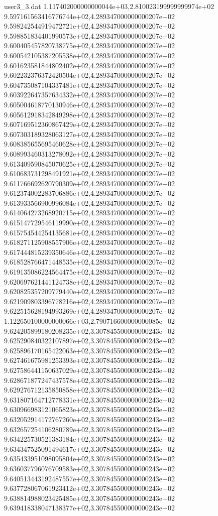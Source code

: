 \begin{filecontents}{user3_3.dat}
1.117402000000000044e+03,2.810023199999999974e+02
9.597161563416776744e+02,4.289347000000000207e+02
9.598242544919472721e+02,4.289347000000000207e+02
9.598851834401990573e+02,4.289347000000000207e+02
9.600405457820738775e+02,4.289347000000000207e+02
9.600542105387205538e+02,4.289347000000000207e+02
9.601623581844802402e+02,4.289347000000000207e+02
9.602232376372420504e+02,4.289347000000000207e+02
9.604735087104337481e+02,4.289347000000000207e+02
9.603922647357634332e+02,4.289347000000000207e+02
9.605004618770130946e+02,4.289347000000000207e+02
9.605612918342849298e+02,4.289347000000000207e+02
9.607169512360867429e+02,4.289347000000000207e+02
9.607303189328063127e+02,4.289347000000000207e+02
9.608385655695460628e+02,4.289347000000000207e+02
9.608993460313278092e+02,4.289347000000000207e+02
9.613409590845070625e+02,4.289347000000000207e+02
9.610683731298491921e+02,4.289347000000000207e+02
9.611766692620790309e+02,4.289347000000000207e+02
9.612374002283706886e+02,4.289347000000000207e+02
9.613933566900996084e+02,4.289347000000000207e+02
9.614064273268920715e+02,4.289347000000000207e+02
9.615147729546119990e+02,4.289347000000000207e+02
9.615754544254135681e+02,4.289347000000000207e+02
9.618271125908557906e+02,4.289347000000000207e+02
9.617444815239350646e+02,4.289347000000000207e+02
9.618528766471448535e+02,4.289347000000000207e+02
9.619135086224564475e+02,4.289347000000000207e+02
9.620697621441124738e+02,4.289347000000000207e+02
9.620825357209779440e+02,4.289347000000000207e+02
9.621909803396778216e+02,4.289347000000000207e+02
9.622515628194993269e+02,4.289347000000000207e+02
1.122650100000000066e+03,2.790716600000000085e+02
9.624205899180208235e+02,3.307845500000000243e+02
9.625290840322107897e+02,3.307845500000000243e+02
9.625896170165422063e+02,3.307845500000000243e+02
9.627461675981253393e+02,3.307845500000000243e+02
9.627586441150637029e+02,3.307845500000000243e+02
9.628671877247437578e+02,3.307845500000000243e+02
9.629276712135850858e+02,3.307845500000000243e+02
9.631807164712778331e+02,3.307845500000000243e+02
9.630966983121065823e+02,3.307845500000000243e+02
9.632052914172767260e+02,3.307845500000000243e+02
9.632657254106280789e+02,3.307845500000000243e+02
9.634225730521383184e+02,3.307845500000000243e+02
9.634347525091494617e+02,3.307845500000000243e+02
9.635433951098095804e+02,3.307845500000000243e+02
9.636037796076709583e+02,3.307845500000000243e+02
9.640513443192487557e+02,3.307845500000000243e+02
9.637728067061923412e+02,3.307845500000000243e+02
9.638814988023425485e+02,3.307845500000000243e+02
9.639418338047138377e+02,3.307845500000000243e+02

\end{filecontents}
